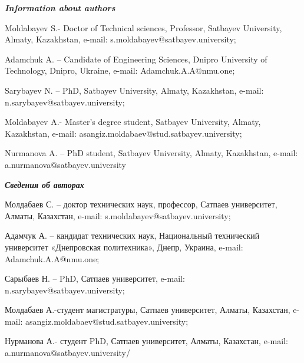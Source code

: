 \emph{{\bfseries Information about authors}}

Moldabayev S.- Doctor of Technical sciences, Professor, Satbayev
University, Almaty, Kazakhstan, e-mail:
s.moldabayev@satbayev.university;

Adamchuk A. -- Candidate of Engineering Sciences, Dnipro University of
Technology, Dnipro, Ukraine, e-mail: Adamchuk.A.A@nmu.one;

Sarybayev N. -- PhD, Satbayev University, Almaty, Kazakhstan, e-mail:
n.sarybayev@satbayev.university;

Moldabayev A.- Master's degree student, Satbayev University, Almaty,
Kazakhstan, e-mail: asangiz.moldabaev@stud.satbayev.university;

Nurmanova A. -- PhD student, Satbayev University, Almaty, Kazakhstan,
e-mail: a.nurmanova@satbayev.university

\emph{{\bfseries Сведения об авторах}}

Молдабаев С. -- доктор технических наук, профессор, Сатпаев университет,
Алматы, Казахстан, e-mail: s.moldabayev@satbayev.university;

Адамчук А. -- кандидат технических наук, Национальный технический
университет «Днепровская политехника», Днепр, Украина, e-mail:
Adamchuk.A.A@nmu.one;

Сарыбаев Н. -- PhD, Сатпаев университет, e-mail:
n.sarybayev@satbayev.university;

Молдабаев А.-студент магистратуры, Сатпаев университет, Алматы,
Казахстан, e-mail: asangiz.moldabaev@stud.satbayev.university;

Нурманова А.- студент PhD, Сатпаев университет, Алматы, Казахстан,
e-mail: a.nurmanova@satbayev.university/

\emph{{\bfseries \hfill\break
}}